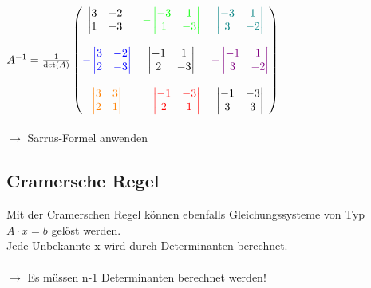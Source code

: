 			$A^{-1} = \frac{1}{\det(A)} \begin{pmatrix}
			\begin{vmatrix}	3 & -2 \\ 1 & -3 \end{vmatrix} & \textcolor{green}{- \begin{vmatrix}	-3 & 1 \\ 1 & -3 \end{vmatrix}} & \textcolor{teal}{\begin{vmatrix}	-3 & 1 \\ 3 & -2 \end{vmatrix}} \\
			\\
			\textcolor{blue}{- \begin{vmatrix}	3 & -2 \\ 2 & -3 \end{vmatrix}} & \begin{vmatrix}	-1 & 1 \\ 2 & -3 \end{vmatrix} & 	\textcolor{violet}{- \begin{vmatrix}	-1 & 1 \\ 3 & -2 \end{vmatrix}} \\
			\\
			\textcolor{orange}{\begin{vmatrix}	3 & 3 \\ 2 & 1 \end{vmatrix}} & \textcolor{red}{- \begin{vmatrix}	-1 & -3 \\ 2 & 1 \end{vmatrix}} & \begin{vmatrix}	-1 & -3 \\ 3 & 3 \end{vmatrix} 
									\end{pmatrix}$ \\ \\
				$\rightarrow$ Sarrus-Formel anwenden \\
										
		    
		    \subsection{Cramersche Regel}
			Mit der Cramerschen Regel können ebenfalls Gleichungssysteme von Typ $A \cdot x = b$ gelöst werden. \\
			Jede Unbekannte x wird durch Determinanten berechnet. \\
			\\
			$\rightarrow$ Es müssen n-1 Determinanten berechnet werden!	 \\
			
